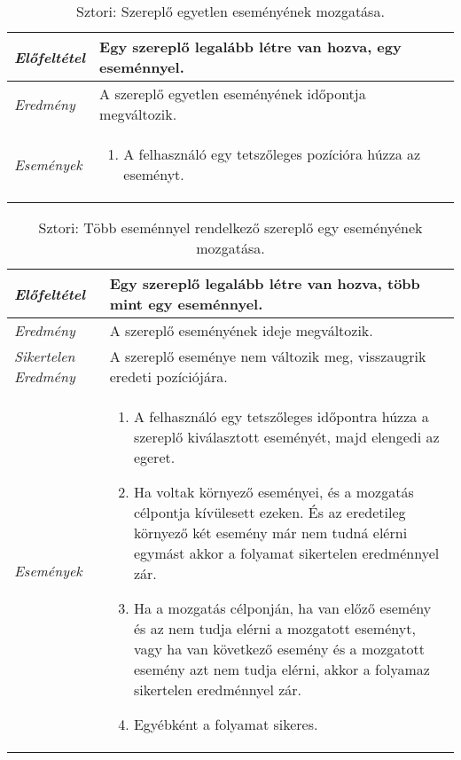 \begin{table}[H]
	\centering
	\begin{tabular}{ | m{} | m{} | }
		\hline
		\emph{Előfeltétel} & Egy szereplő legalább létre van hozva, egy eseménnyel.\\
		\hline
		\emph{Eredmény} & A szereplő egyetlen eseményének időpontja megváltozik. \\
		\hline
		\hline
		\emph{Események} &
		\begin{enumerate}[itemsep=-1ex]
			\item A felhasználó egy tetszőleges pozícióra húzza az eseményt.
		\end{enumerate}
		\\
		\hline
	\end{tabular}
	\caption{Sztori: Szereplő egyetlen eseményének mozgatása.}
	\label{tab:story-timeline-pan-actor-single-event}
\end{table}


\begin{table}[H]
	\centering
	\begin{tabular}{ | m{} | m{} | }
		\hline
		\emph{Előfeltétel} & Egy szereplő legalább létre van hozva, több mint egy eseménnyel.\\
		\hline
		\emph{Eredmény} & A szereplő eseményének ideje megváltozik. \\
		\hline
		\emph{Sikertelen Eredmény} & A szereplő eseménye nem változik meg, visszaugrik eredeti pozíciójára. \\
		\hline
		\hline
		\emph{Események} &
		\begin{enumerate}[itemsep=-1ex]
			\item A felhasználó egy tetszőleges időpontra húzza a szereplő kiválasztott eseményét, majd elengedi az egeret.
			\item Ha voltak környező eseményei, és a mozgatás célpontja kívülesett ezeken. És az eredetileg környező két esemény már nem tudná elérni egymást akkor a folyamat sikertelen eredménnyel zár.
			\item Ha a mozgatás célponján, ha van előző esemény és az nem tudja elérni a mozgatott eseményt, vagy ha van következő esemény és a mozgatott esemény azt nem tudja elérni, akkor a folyamaz sikertelen eredménnyel zár.
			\item Egyébként a folyamat sikeres.
		\end{enumerate}
		\\
		\hline
	\end{tabular}
	\caption{Sztori: Több eseménnyel rendelkező szereplő egy eseményének mozgatása.}
	\label{tab:story-timeline-pan-actor-more-event}
\end{table}


